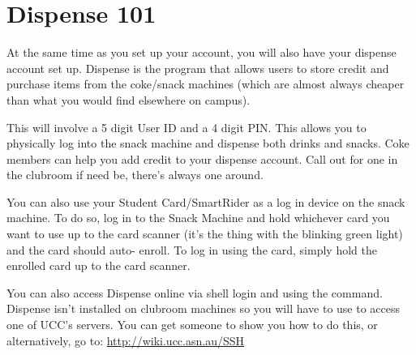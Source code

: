 \chapter{Dispense 101}


At the same time as you set up your account, you will also have your dispense account set up. Dispense is the program that allows users to store credit and purchase items from the coke/snack machines (which are almost always cheaper than what you would find elsewhere on campus).


This will involve a 5 digit User ID and a 4 digit PIN. This allows you to physically log into the snack machine and dispense both drinks and snacks.
Coke members can help you add credit to your dispense account. Call out for one in the clubroom if need be, there's always one around.


You can also use your Student Card/SmartRider as a log in device on the snack machine. To do so, log in to the Snack Machine and hold whichever card you want to use up to the card scanner (it's the thing with the blinking green light) and the card should auto- enroll. To log in using the card, simply hold the enrolled card up to the card scanner.


You can also access Dispense online via shell login and using the  command. Dispense isn't installed on clubroom machines so you will have to use  to access one of UCC's servers. You can get someone to show you how to do this, or alternatively, go to: \url{http://wiki.ucc.asn.au/SSH}

